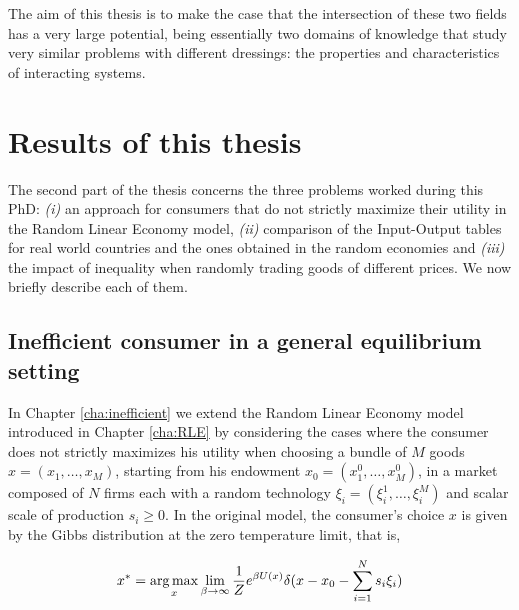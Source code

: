 The aim of this thesis is to make the case that the intersection of these two fields has a very large potential, being essentially two domains of knowledge that study very similar problems with different dressings: the properties and characteristics of interacting systems. 

\section{Results of this thesis}

The second part of the thesis concerns the three problems worked during this PhD: \emph{(i)} an approach for consumers that do not strictly maximize their utility in the Random Linear Economy model, \emph{(ii)} comparison of the Input-Output tables for real world countries and the ones obtained in the random economies and \emph{(iii)} the impact of inequality when randomly trading goods of different prices. We now briefly describe each of them.

\subsection{Inefficient consumer in a general equilibrium setting}

In Chapter \ref{cha:inefficient} we extend the Random Linear Economy model introduced in Chapter \ref{cha:RLE} by considering the cases where the consumer does not strictly maximizes his utility when choosing a bundle of $M$ goods $x = (x_1, \ldots, x_M)$, starting from his endowment $x_0 = (x_1^0, \ldots, x_M^0)$, in a market composed of $N$ firms each with a random technology $\xi_i = (\xi_i^1, \ldots, \xi_i^M)$ and scalar scale of production $s_i \geq 0$. In the original model, the consumer's choice $x$ is given by the Gibbs distribution at the zero temperature limit, that is,

\begin{equation}
    x^\ast = \operatorname*{arg\,max}_x \lim_{\beta \to \infty} \frac{1}{Z} e^{\beta U(x)} \delta (x - x_0 - \sum_{i=1}^N s_i \xi_i)
\end{equation}

